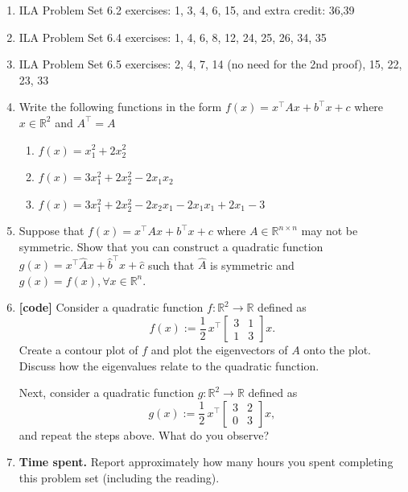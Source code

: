 \documentclass[letterpaper]{article}
\newcommand{\Real}{\mathbb{R}}
\newcommand{\tr}{^\top}
\begin{document}
\begin{enumerate}
\item ILA Problem Set 6.2 exercises: 1, 3, 4, 6, 15, and extra credit: 36,39
\item ILA Problem Set 6.4 exercises: 1, 4, 6, 8, 12, 24, 25, 26, 34, 35
\item ILA Problem Set 6.5 exercises: 2, 4, 7, 14 (no need for the 2nd proof), 15, 22, 23, 33
\item Write the following functions in the form $f(x) = x\tr A x + b\tr x + c$ where $x \in \Real^2$ and $A\tr = A$ 
  \begin{enumerate}
  \item $f(x) = x_1^2 + 2 x_2^2$
  \item $f(x) = 3x_1^2 + 2 x_2^2 - 2x_1x_2$
  \item $f(x) = 3x_1^2 + 2 x_2^2 - 2x_2x_1 - 2x_1x_1 + 2x_1 - 3$
  \end{enumerate}
\item Suppose that $f(x) = x\tr A x + b\tr x + c$ where $A \in \Real^{n\times n}$ may not be symmetric. Show that you can construct a quadratic function $g(x) = x\tr \hat{A} x + \hat{b}\tr x + \hat{c}$ such that $\hat{A}$ is symmetric and $g(x) = f(x) , \forall x \in \Real^n$. 

  
\item \textbf{[code]} Consider a quadratic function $f \colon \Real^2 \to  \Real$ defined as
  \[
    f(x) := \frac{1}{2} \, x\tr\begin{bmatrix} 3 & 1 \\1 & 3 \end{bmatrix} x.
  \]
  Create a contour plot of $f$ and plot the eigenvectors of $A$ onto the plot. Discuss how the eigenvalues relate to the quadratic function.

  Next, consider a quadratic function $g \colon \Real^2 \to  \Real$ defined as
  \[
    g(x) := \frac{1}{2} \, x\tr\begin{bmatrix} 3 & 2 \\0 & 3 \end{bmatrix} x,
  \]
  and repeat the steps above. What do you observe?
 
\item \textbf{Time spent.} Report approximately how many hours you spent completing this problem set (including the reading).
\end{enumerate}
\end{document}
